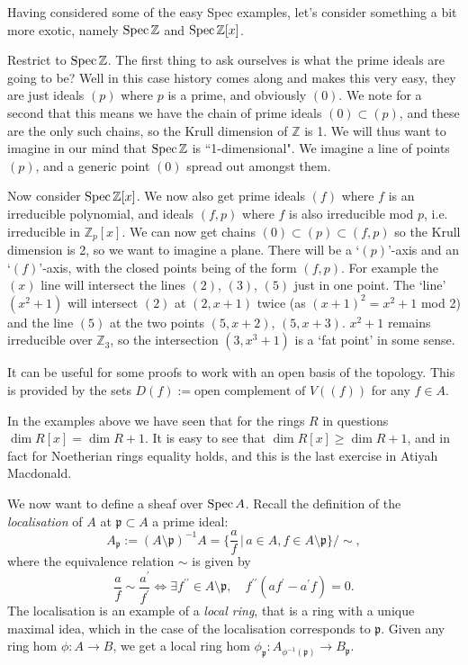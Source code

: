 \documentclass[000-main.tex]{subfiles}
\begin{document}
\begin{example}
	Having considered some of the easy Spec examples, let's consider something a bit more exotic, namely $\operatorname{Spec} \mathbb{Z}$ and $\operatorname{Spec} \mathbb{Z}[x]$. 
	
	
	Restrict to $\operatorname{Spec} \mathbb{Z}$. The first thing to ask ourselves is what the prime ideals are going to be? Well in this case history comes along and makes this very easy, they are just ideals $(p)$ where $p$ is a prime, and obviously $(0)$. We note for a second that this means we have the chain of prime ideals $(0) \subset (p)$, and these are the only such chains, so the Krull dimension of $\mathbb{Z}$ is 1. We will thus want to imagine in our mind that $\operatorname{Spec} \mathbb{Z}$ is ``1-dimensional". We imagine a line of points $(p)$, and a generic point $(0)$ spread out amongst them. 
	
	Now consider $\operatorname{Spec} \mathbb{Z}[x]$. We now also get prime ideals $(f)$ where $f$ is an irreducible polynomial, and ideals $(f, p)$ where $f$ is also irreducible mod $p$, i.e. irreducible in $\mathbb{Z}_p[x]$. We can now get chains $(0) \subset (p) \subset (f, p)$ so the Krull dimension is 2, so we want to imagine a plane. There will be a `$(p)$'-axis and an `$(f)$'-axis, with the closed points being of the form $(f, p)$. For example the $(x)$ line will intersect the lines $(2)$, $(3)$, $(5)$ just in one  point. The `line' $(x^2+1)$ will intersect $(2)$ at $(2, x+1)$ twice (as $(x+1)^2 = x^2 + 1$ mod 2) and the line $(5)$ at the two points $(5, x+2)$, $(5, x+3)$. $x^2+1$ remains irreducible over $\mathbb{Z}_3$, so the intersection $(3, x^3+1)$ is a `fat point' in some sense. 
\end{example}

\begin{remark}
	It can be useful for some proofs to work with an open basis of the topology. This is provided by the sets $D(f) := \text{open complement of }V((f))$ for any $f \in A$.  
\end{remark}

\begin{remark}
	In the examples above we have seen that for the rings $R$ in questions $\dim R[x] = \dim R + 1$. It is easy to see that $\dim R[x] \geq \dim R + 1$, and in fact for Noetherian rings equality holds, and this is the last exercise in Atiyah Macdonald. 
\end{remark}

We now want to define a sheaf over $\operatorname{Spec} A$. Recall the definition of the \emph{localisation} of $A$ at $\mathfrak{p} \subset A$ a prime ideal:
\[
A_{\mathfrak{p}} := (A\setminus \mathfrak{p})^{-1} A = \lbrace \frac{a}{f} \, | \, a \in A, f \in A\setminus \mathfrak{p} \rbrace / \sim,
\]
where the equivalence relation $\sim$ is given by 
\[
\frac{a}{f} \sim \frac{a^\prime}{f^\prime} \Leftrightarrow \exists f^{\prime \prime} \in A\setminus \mathfrak{p} , \quad f^{\prime \prime}(a f^\prime - a^\prime f) = 0. 
\]
The localisation is an example of a \emph{local ring}, that is a ring with a unique maximal idea, which in the case of the localisation corresponds to $\mathfrak{p}$. Given any ring hom $\phi : A \to B$, we get a local ring hom $\phi_{\mathfrak{p}} : A_{\phi^{-1}(\mathfrak{p})} \to B_{\mathfrak{p}}$. 
\end{document}
